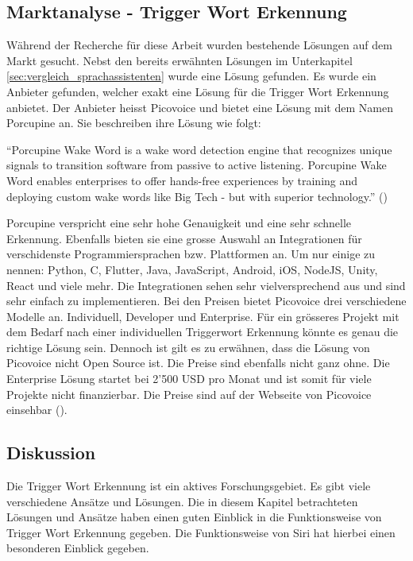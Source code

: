 \documentclass[11pt,a4paper]{article}
\begin{document}
\subsection{Marktanalyse - Trigger Wort Erkennung}
Während der Recherche für diese Arbeit wurden bestehende Lösungen auf dem Markt gesucht. Nebst den 
bereits erwähnten Lösungen im Unterkapitel \ref{sec:vergleich_sprachassistenten} wurde eine Lösung 
gefunden. Es wurde ein Anbieter gefunden, welcher exakt eine Lösung für die Trigger Wort Erkennung 
anbietet. Der Anbieter heisst Picovoice und bietet eine Lösung mit dem Namen Porcupine an. Sie 
beschreiben ihre Lösung wie folgt:

\begin{displayquote}
	``Porcupine Wake Word is a wake word detection engine that recognizes unique signals to
	transition software from passive to active listening. Porcupine Wake Word enables enterprises
	to offer hands-free experiences by training and deploying custom wake words like Big Tech -
	but with superior technology.'' (\cite{picovoice2023porcupine})
\end{displayquote}

\noindent \newline
Porcupine verspricht eine sehr hohe Genauigkeit und eine sehr schnelle Erkennung. Ebenfalls bieten
sie eine grosse Auswahl an Integrationen für verschidenste Programmiersprachen bzw. Plattformen an.
Um nur einige zu nennen: Python, C, Flutter, Java, JavaScript, Android, iOS, NodeJS, Unity, React
und viele mehr. Die Integrationen sehen sehr vielversprechend aus und sind sehr einfach zu
implementieren. Bei den Preisen bietet Picovoice drei verschiedene Modelle an. Individuell,
Developer und Enterprise. Für ein grösseres Projekt mit dem Bedarf nach einer individuellen
Triggerwort Erkennung könnte es genau die richtige Lösung sein. Dennoch ist gilt es zu erwähnen,
dass die Lösung von Picovoice nicht Open Source ist. Die Preise sind ebenfalls nicht ganz ohne.
Die Enterprise Lösung startet bei 2'500 USD pro Monat und ist somit für viele Projekte nicht
finanzierbar. Die Preise sind auf der Webseite von Picovoice einsehbar
(\cite{picovoice2023porcupine}).



\subsection{Diskussion}
Die Trigger Wort Erkennung ist ein aktives Forschungsgebiet. Es gibt viele verschiedene Ansätze und
Lösungen. Die in diesem Kapitel betrachteten Lösungen und Ansätze haben einen guten Einblick in die
Funktionsweise von Trigger Wort Erkennung gegeben. Die Funktionsweise von Siri hat hierbei einen
besonderen Einblick gegeben.
\end{document}
